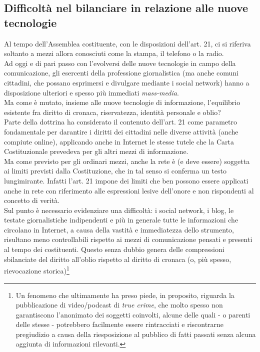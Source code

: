 \subsection{Difficoltà nel bilanciare in relazione alle nuove tecnologie}
Al tempo dell'Assemblea costituente, con le disposizioni dell'art. 21, ci si riferiva soltanto a mezzi allora conosciuti come la stampa, il telefono o la radio.
\\Ad oggi e di pari passo con l'evolversi delle nuove tecnologie in campo della comunicazione, gli esercenti della professione giornalistica (ma anche comuni cittadini, che possano esprimersi e divulgare mediante i social network) hanno a disposizione ulteriori e spesso più immediati \textit{mass-media}.
\\Ma come è mutato, insieme alle nuove tecnologie di informazione, l'equilibrio esistente fra diritto di cronaca, riservatezza, identità personale e oblio?
\\Parte della dottrina ha considerato il contenuto dell'art. 21 come parametro fondamentale per darantire i diritti dei cittadini nelle diverse attività (anche compiute online), applicando anche in Internet le stesse tutele che la Carta Costituzionale prevedeva per gli altri mezzi di informazione.
\\Ma come previsto per gli ordinari mezzi, anche la rete è (e deve essere) soggetta ai limiti previsti dalla Costituzione, che in tal senso si conferma un testo lungimirante.
Infatti l'art. 21 impone dei limiti che ben possono essere applicati anche in rete con riferimento alle espressioni lesive dell'onore e non rispondenti al concetto di verità.
\\Sul punto è necessario evidenziare una difficoltà: i social network, i blog, le testate giornalistiche indipendenti e più in generale tutte le informazioni che circolano in Internet, a causa della vastità e immediatezza dello strumento, risultano meno controllabili rispetto ai mezzi di comunicazione pensati e presenti al tempo dei costituenti.
Questo senza dubbio genera delle compressioni sbilanciate del diritto all'oblio rispetto al diritto di cronaca (o, più spesso, rievocazione storica)\footnote{Un fenomeno che ultimamente ha preso piede, in proposito, riguarda la pubblicazione di video/podcast di \textit{true crime}, che molto spesso non garantiscono l'anonimato dei soggetti coinvolti, alcune delle quali - o parenti delle stesse - potrebbero facilmente essere rintracciati e riscontrarne pregiudizio a causa della riesposizione al pubblico di fatti passati senza alcuna aggiunta di informazioni rilevanti.}
